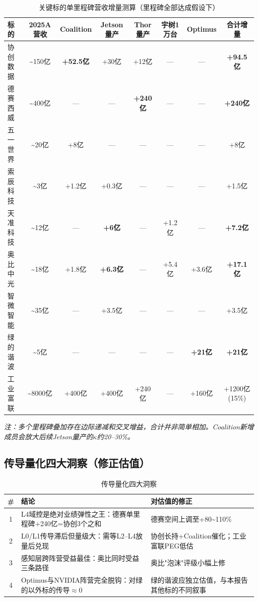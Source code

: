 \begin{table}[H]
\centering\scriptsize
\renewcommand{\arraystretch}{1.15}
\begin{tabularx}{\textwidth}{l c c c c c c c}
\toprule
\textbf{标的} & \textbf{2025A营收} & \textbf{Coalition} & \textbf{Jetson量产} & \textbf{Thor量产} & \textbf{宇树1万台} & \textbf{Optimus} & \textbf{合计增量} \\
\midrule
协创数据 & \textasciitilde150亿 & \textbf{+52.5亿} & +30亿 & +12亿 & — & — & \textbf{+94.5亿} \\
德赛西威 & \textasciitilde400亿 & — & — & \textbf{+240亿} & — & — & \textbf{+240亿} \\
五一世界 & \textasciitilde20亿 & +8亿 & — & — & — & — & +8亿 \\
索辰科技 & \textasciitilde3亿 & +1.2亿 & +0.3亿 & — & — & — & +1.5亿 \\
天准科技 & \textasciitilde12亿 & — & \textbf{+6亿} & — & +1.2亿 & — & \textbf{+7.2亿} \\
奥比中光 & \textasciitilde18亿 & +1.8亿 & \textbf{+6.3亿} & — & +5.4亿 & +3.6亿 & \textbf{+17.1亿} \\
智微智能 & \textasciitilde35亿 & — & +3.5亿 & — & — & — & +3.5亿 \\
绿的谐波 & \textasciitilde5亿 & — & — & — & — & \textbf{+21亿} & \textbf{+21亿} \\
工业富联 & \textasciitilde8000亿 & +400亿 & +400亿 & +240亿 & — & +160亿 & +1200亿(15\%) \\
\bottomrule
\end{tabularx}
\caption{关键标的单里程碑营收增量测算（里程碑全部达成假设下）}
\end{table}

\textit{注：多个里程碑叠加存在边际递减和交叉增益，合计并非简单相加。Coalition新增成员会放大后续Jetson量产的$\kappa$约20--30\%。}

\subsection{传导量化四大洞察（修正估值）}

\begin{table}[H]
\centering\scriptsize
\renewcommand{\arraystretch}{1.2}
\begin{tabularx}{\textwidth}{c X X}
\toprule
\textbf{\#} & \textbf{结论} & \textbf{对估值的修正} \\
\midrule
1 & L4域控是绝对业绩弹性之王：德赛单里程碑+240亿=协创3个之和 & 德赛空间上调至+80\textasciitilde110\% \\
2 & L0/L1传导滞后但量级大：需等L2--L4放量后兑现 & 协创长持+Coalition催化；工业富联PEG低估 \\
3 & 感知层跨阵营受益最佳：奥比同时受益三条路径 & 奥比"泡沫"评级小幅上修 \\
4 & Optimus与NVIDIA阵营完全脱钩：对绿的以外标的传导$\approx$0 & 绿的谐波应独立估值，与本报告其他标的不同叙事 \\
\bottomrule
\end{tabularx}
\caption{传导量化四大洞察}
\end{table}

